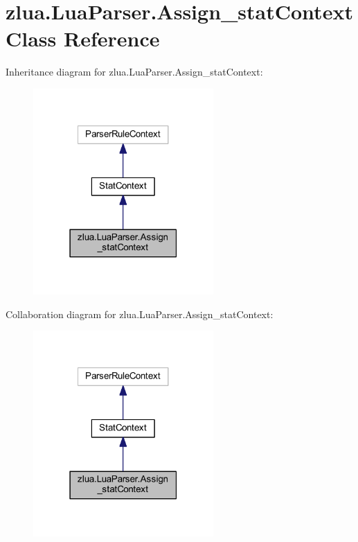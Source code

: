 \hypertarget{classzlua_1_1_lua_parser_1_1_assign__stat_context}{}\section{zlua.\+Lua\+Parser.\+Assign\+\_\+stat\+Context Class Reference}
\label{classzlua_1_1_lua_parser_1_1_assign__stat_context}


Inheritance diagram for zlua.\+Lua\+Parser.\+Assign\+\_\+stat\+Context\+:
\nopagebreak
\begin{figure}[H]
\begin{center}
\leavevmode
\includegraphics[width=195pt]{classzlua_1_1_lua_parser_1_1_assign__stat_context__inherit__graph}
\end{center}
\end{figure}


Collaboration diagram for zlua.\+Lua\+Parser.\+Assign\+\_\+stat\+Context\+:
\nopagebreak
\begin{figure}[H]
\begin{center}
\leavevmode
\includegraphics[width=195pt]{classzlua_1_1_lua_parser_1_1_assign__stat_context__coll__graph}
\end{center}
\end{figure}
